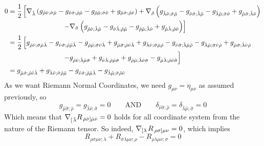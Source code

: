 \documentclass{article}
\begin{document}
		\begin{align*}
			0 &= \frac12 \left[ \nabla_{\hat\lambda} \left( 	g_{\hat\rho\hat\nu;\hat\sigma \hat\mu}  - g_{\hat\nu\hat\sigma;\hat\rho \hat\mu} - g_{\hat\rho\hat\mu;\hat\sigma \hat\nu} + g_{\hat\mu\hat\sigma;\hat\rho \hat\nu} \right) + \nabla_{\hat\rho} \left(
				g_{\hat\lambda\hat\nu;\hat\sigma \hat\mu}  - g_{\hat\nu\hat\sigma;\hat\lambda \hat\mu} - g_{\hat\lambda\hat\mu;\hat\sigma \hat\nu} + g_{\hat\mu\hat\sigma;\hat\lambda \hat\nu}
			\right) \right. \\
			&\quad\quad\quad\quad\quad\quad\quad\quad 
			\left. - \nabla_{\hat\sigma} \left(	g_{\hat\rho\hat\nu;\hat\lambda \hat\mu}  - g_{\hat\nu\hat\lambda;\hat\rho \hat\mu} - g_{\hat\rho\hat\mu;\hat\lambda \hat\nu} + g_{\hat\mu\hat\lambda;\hat\rho \hat\nu} \right) \right] \\
			&= \frac12 \left[ g_{\hat\rho\hat\nu;\hat\sigma \hat\mu \hat\lambda}  - g_{\hat\nu\hat\sigma;\hat\rho \hat\mu \hat\lambda} - g_{\hat\rho\hat\mu;\hat\sigma \hat\nu \hat\lambda} + g_{\hat\mu\hat\sigma;\hat\rho \hat\nu \hat\lambda} + 
			g_{\hat\lambda\hat\nu;\hat\sigma \hat\mu \hat\rho}  - g_{\hat\nu\hat\sigma;\hat\lambda \hat\mu \hat\rho} - g_{\hat\lambda\hat\mu;\hat\sigma \hat\nu \hat\rho} + g_{\hat\mu\hat\sigma;\hat\lambda \hat\nu \hat\rho} \right. \\
			&\quad\quad\quad\quad\quad\quad\quad\quad \left. - g_{\hat\rho\hat\nu;\hat\lambda \hat\mu\hat\sigma}  + g_{\hat\nu\hat\lambda;\hat\rho \hat\mu\hat\sigma} + g_{\hat\rho\hat\mu;\hat\lambda \hat\nu\hat\sigma} - g_{\hat\mu\hat\lambda;\hat\rho \hat\nu\hat\sigma} \right] \\
			&= g_{\hat\mu\hat\sigma;\hat\rho \hat\nu \hat\lambda} + g_{\hat\lambda\hat\nu;\hat\sigma \hat\rho \hat\mu} - g_{\hat\nu\hat\sigma;\hat\rho \hat\mu \hat\lambda} - g_{\hat\lambda\hat\mu;\hat\sigma \hat\rho \hat\nu}
		\end{align*}
		As we want Riemann Normal Coordinates, we need $g_{\mu\nu} = \eta_{\mu\nu}$ as assumed previously, so
		$$ g_{\hat\mu\hat\sigma;\hat\rho} = g_{\hat\lambda \hat\nu; \hat\sigma} = 0 \quad\quad \text{AND} \quad\quad \delta_{\hat\nu\hat\sigma; \hat\rho} = \delta_{\hat\lambda\hat\mu; \hat\sigma} = 0$$
		Which means that $\nabla_{\left[\right. \hat\lambda} R_{\left. \hat\rho\hat\sigma\right]\hat\mu\hat\nu} = 0$ holds for all coordinate system from the nature of the Riemann tensor. So indeed, $\nabla_{\left[\lambda\right.} R_{\left. \rho \sigma \right] \mu\nu} = 0$, which implies
		$$ R_{\rho\sigma\mu\nu;\lambda} + R_{\sigma\lambda\mu\nu;\rho} - R_{\rho\lambda\mu\nu;\sigma} = 0$$
\end{document}
